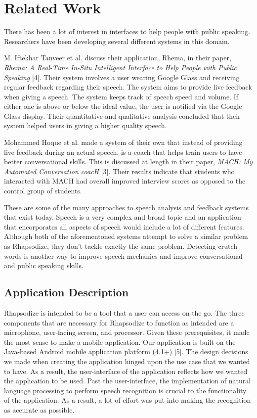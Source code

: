 \documentclass{sigchi}
\begin{document}
\section{Related Work}

There has been a lot of interest in interfaces to help people with public speaking. Researchers have been developing several different systems in this domain. 

M. Iftekhar Tanveer et al. discuss their application, Rhema, in their paper, \textit{Rhema: A Real-Time In-Situ Intelligent Interface to Help People with Public Speaking} [4]. Their system involves a user wearing Google Glass and receiving regular feedback regarding their speech. The system aims to provide live feedback when giving a speech. The system keeps track of speech speed and volume. If either one is above or below the ideal value, the user is notified via the Google Glass display. Their quantitative and qualitative analysis concluded that their system helped users in giving a higher quality speech.

Mohammed Hoque et al. made a system of their own that instead of providing live feedback during an actual speech, is a coach that helps train users to have better conversational skills. This is discussed at length in their paper, \textit{MACH: My Automated Conversation coacH} [3]. Their results indicate that students who interacted with MACH had overall improved interview scores as opposed to the control group of students. 

These are some of the many approaches to speech analysis and feedback systems that exist today. Speech is a very complex and broad topic and an application that encorporates all aspects of speech would include a lot of different features. Although both of the aforementoned systems attempt to solve a similar problem as Rhapsodize, they don't tackle exactly the same problem. Detecting crutch words is another way to improve speech mechanics and improve conversational and public speaking skills.

\subsection{Application Description}

Rhapsodize is intended to be a tool that a user can access on the go. The three components that are necessary for Rhapsodize to function as intended are a microphone, user-facing screen, and processor. Given these prerequisites, it made the most sense to make a mobile application. Our application is built on the Java-based Android mobile application platform (4.1+) [5]. The design decisions we made when creating the application hinged upon the use case that we wanted to have. As a result, the user-interface of the application reflects how we wanted the application to be used. Past the user-interface, the implementation of natural language processing to perform speech recognition is crucial to the functionality of the application. As a result, a lot of effort was put into making the recognition as accurate as possible.
\end{document}
